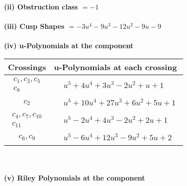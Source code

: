 \documentclass[1p]{elsarticle_modified}
\theoremstyle{definition}
\begin{document}
\flushleft \textbf{(ii) Obstruction class $= -1$}\\~\\
\flushleft \textbf{(iii) Cusp Shapes $= -3 u^4-9 u^3-12 u^2-9 u-9$}\\~\\
\newpage\renewcommand{\arraystretch}{1}
\flushleft \textbf{(iv) u-Polynomials at the component}\newline \\
\begin{tabular}{m{50pt}|m{274pt}}
Crossings & \hspace{64pt}u-Polynomials at each crossing \\
\hline $$\begin{aligned}c_{1},c_{3},c_{5}\\c_{8}\end{aligned}$$&$\begin{aligned}
&u^5+4 u^4+3 u^3-2 u^2+u+1
\end{aligned}$\\
\hline $$\begin{aligned}c_{2}\end{aligned}$$&$\begin{aligned}
&u^5+10 u^4+27 u^3+6 u^2+5 u+1
\end{aligned}$\\
\hline $$\begin{aligned}c_{4},c_{7},c_{10}\\c_{11}\end{aligned}$$&$\begin{aligned}
&u^5-2 u^4+4 u^3-2 u^2+2 u+1
\end{aligned}$\\
\hline $$\begin{aligned}c_{6},c_{9}\end{aligned}$$&$\begin{aligned}
&u^5-6 u^4+12 u^3-9 u^2+5 u+2
\end{aligned}$\\
\hline
\end{tabular}\\~\\
\newpage\renewcommand{\arraystretch}{1}
\flushleft \textbf{(v) Riley Polynomials at the component}\newline \\
\end{document}
